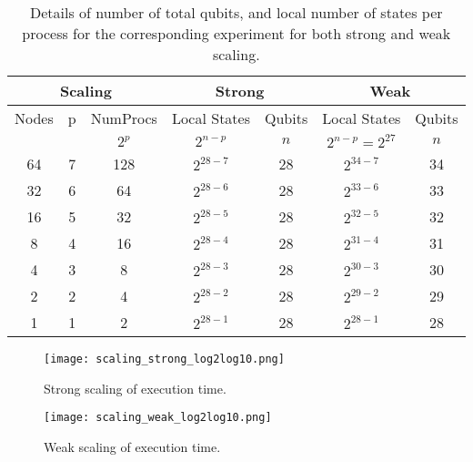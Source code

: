 \begin{table}[H]
    \begin{tabular}{|c|c|c||c|c||c|c|}
        \hline
        \multicolumn{3}{|c||}{Scaling} & \multicolumn{2}{|c||}{Strong} & \multicolumn{2}{|c|}{Weak}\\
        \hline
        Nodes           &  p    & NumProcs   & Local States  & Qubits      & Local States & Qubits \\
                   &     &  $2^p$  &  $ 2^{n-p}$  &   $n$      & $ 2^{n-p} = 2^{27}$ &  $n$\\
    
        \hline
        64              &   7   & 128                   & $2^{28-7}$                        & 28         & $2^{34-7}$& 34 \\
        32              &   6   & 64                    & $2^{28-6}$                         & 28        &$2^{33-6}$&  33 \\
        16              &   5   & 32                    & $2^{28-5}$                         & 28        &$2^{32-5}$&  32 \\
        8               &   4   & 16                    & $2^{28-4}$                         & 28        &$2^{31-4}$&  31 \\
        4               &   3   & 8                     & $2^{28-3}$                         & 28        &$2^{30-3}$&  30 \\
        2               &   2   & 4                     & $2^{28-2}$                         & 28        &$2^{29-2}$&  29 \\
        1               &   1   & 2                     & $2^{28-1}$                        & 28         &$2^{28-1}$&  28\\
     \hline
    \end{tabular}
    \caption{Details of number of total qubits, and local number of states per process for the corresponding experiment for both strong and weak scaling. }
    \label{tab:scaling_experiment_config}
\end{table}

\begin{figure}[H]
	\centering
	\begin{minipage}{.5\linewidth}
		\centering
		\texttt{[image: scaling\_strong\_log2log10.png]}
		\caption{Strong scaling of execution time.}
		\label{fig:strong_scaling}
	\end{minipage}%
	\begin{minipage}{.5\linewidth}
		\centering
		\texttt{[image: scaling\_weak\_log2log10.png]}
		\caption{Weak scaling of execution time.}
		\label{fig:weak_scaling}
	\end{minipage}
\end{figure}